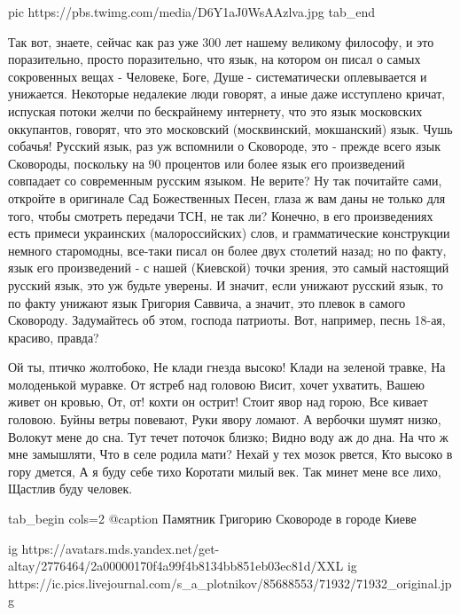      pic https://pbs.twimg.com/media/D6Y1aJ0WsAAzlva.jpg
  tab_end
\fi

Так вот, знаете, сейчас как раз уже 300 лет нашему
великому философу, и это поразительно, просто поразительно, что язык, на
котором он писал о самых сокровенных вещах - Человеке, Боге, Душе -
систематически оплевывается и унижается. Некоторые недалекие люди говорят, а
иные даже исступлено кричат, испуская потоки желчи по бескрайнему интернету,
что это язык московских оккупантов, говорят, что это московский (москвинский,
мокшанский) язык. Чушь собачья! Русский язык, раз уж вспомнили о Сковороде, это
- прежде всего язык Сковороды, поскольку на 90 процентов или более язык его
произведений совпадает со современным русским языком. Не верите? Ну так
почитайте сами, откройте в оригинале Сад Божественных Песен, глаза ж вам даны
не только для того, чтобы смотреть передачи ТСН, не так ли? Конечно, в его
произведениях есть примеси украинских (малороссийских) слов, и грамматические
конструкции немного старомодны, все-таки писал он более двух столетий назад; но
по факту, язык его произведений - с нашей (Киевской) точки зрения, это самый настоящий русский язык, это уж
будьте уверены. И значит, если унижают русский язык, то по факту унижают язык
Григория Саввича, а значит, это плевок в самого Сковороду.  Задумайтесь об
этом, господа патриоты. Вот, например, песнь 18-ая, красиво, правда?

\raggedcolumns
\begin{multicols}{2} %
\setlength{\parindent}{0pt}
\obeycr
Ой ты, птичко жолтобоко,
Не клади гнезда высоко!
Клади на зеленой травке,
На молоденькой муравке.
\smallskip
От ястреб над головою
Висит, хочет ухватить,
Вашею живет он кровью,
От, от! кохти он острит!
\smallskip
Стоит явор над горою,
Все кивает головою.
Буйны ветры повевают,
Руки явору ломают.
\smallskip
А вербочки шумят низко,
Волокут мене до сна.
Тут течет поточок близко;
Видно воду аж до дна.
\smallskip
На что ж мне замышляти,
Что в селе родила мати?
Нехай у тех мозок рвется,
Кто высоко в гору дмется,
\smallskip
А я буду себе тихо
Коротати милый век.
\smallskip
Так минет мене все лихо,
Щастлив буду человек.
\restorecr
\end{multicols} %

\ifcmt
tab_begin cols=2
  @caption Памятник Григорию Сковороде в городе Киеве

  ig https://avatars.mds.yandex.net/get-altay/2776464/2a00000170f4a99f4b8134bb851eb03ec81d/XXL
  ig https://ic.pics.livejournal.com/s_a_plotnikov/85688553/71932/71932_original.jpg

